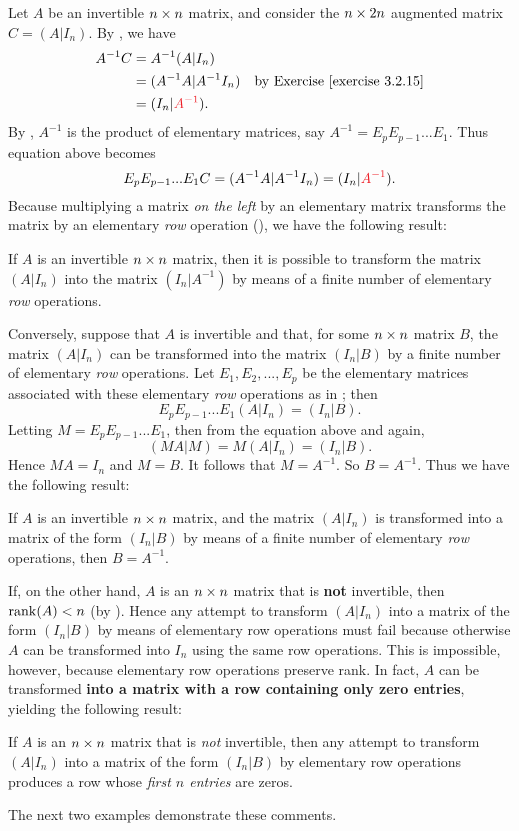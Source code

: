 \begin{remark} \label{remark 3.2.6}
Let \(A\) be an invertible \(n \times n\) matrix, and consider the \(n \times 2n\) augmented matrix \(C = (A|I_n)\).
By , we have
\begin{align*}
    A^{-1}C & = A^{-1} (A | I_n) \\
            & = (A^{-1}A | A^{-1} I_n) & \text{by \EXEC{3.2.15}} \\
            & = (I_n|\RED{A^{-1}}).
\end{align*}
By , \(A^{-1}\) is the product of elementary matrices, say \(A^{-1} = E_p E_{p - 1} ... E_1\).
Thus equation above becomes
\[
    E_p E_{p - 1} ... E_1 C = (A^{-1}A | A^{-1} I_n) = (I_n|\RED{A^{-1}}).
\]
Because multiplying a matrix \emph{on the left} by an elementary matrix transforms the matrix by an elementary \emph{row} operation (), we have the following result:

 If \(A\) is an invertible \(n \times n\) matrix, then it is possible to transform the matrix \((A | I_n)\) into the matrix \((I_n|A^{-1})\) by means of a finite number of elementary \emph{row} operations.

Conversely, suppose that \(A\) is invertible and that, for some \(n \times n\) matrix \(B\), the matrix \((A|I_n)\) can be transformed into the matrix \((I_n|B)\) by a finite number of elementary \emph{row} operations.
Let \(E_1, E_2, ..., E_p\) be the elementary matrices associated with these elementary \emph{row} operations as in ;
then
\[
    E_p E_{p -1} ... E_1 (A|I_n) = (I_n | B).
\]
Letting \(M = E_p E_{p - 1} ... E_1\), then from the equation above and  again,
\[
    (MA | M) = M(A | I_n) = (I_n | B).
\]
Hence \(MA = I_n\) and \(M = B\).
It follows that \(M = A^{-1}\).
So \(B = A^{-1}\).
Thus we have the following result:

 If \(A\) is an invertible \(n \times n\) matrix, and the matrix \((A | I_n)\) is transformed into a matrix of the form \((I_n |B)\) by means of a finite number of elementary \emph{row} operations, then \(B = A^{-1}\).

If, on the other hand, \(A\) is an \(n \times n\) matrix that is \textbf{not} invertible, then \(\mathrm{rank}(A) < n\) (by ).
Hence any attempt to transform \((A|I_n)\) into a matrix of the form \((I_n|B)\) by means of elementary row operations must fail because otherwise \(A\) can be transformed into \(I_n\) using the same row operations.
This is impossible, however, because elementary row operations preserve rank.
In fact, \(A\) can be transformed \textbf{into a matrix with a row containing only zero entries},
yielding the following result:

 If \(A\) is an \(n \times n\) matrix that is \emph{not} invertible, then any attempt to transform \((A | I_n)\) into a matrix of the form \((I_n | B)\) by elementary row operations produces a row whose \emph{first \(n\) entries} are zeros.

The next two examples demonstrate these comments.
\end{remark}

